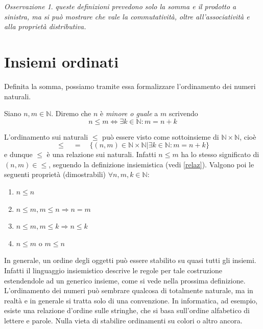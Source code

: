 \documentclass[oneside]{book}
\theoremstyle{remark}
\newtheorem*{osservaz}{Osservazione}
\begin{document}
\begin{osservaz}
\emph{queste definizioni prevedono solo la
somma e il prodotto a sinistra, ma si può mostrare che vale
la \textit{commutatività}, oltre all'associatività e alla
proprietà distributiva.}
\end{osservaz}



\section{Insiemi ordinati}
Definita la somma, possiamo tramite essa formalizzare
l'ordinamento dei numeri naturali.

\begin{tcolorbox}[colback=yellow!30, colframe=yellow!30!black, title={Ordinamento in $\mathbb{N}$}]
Siano $n,m\in\mathbb{N}$. Diremo che $n$ è \textit{minore o guale} a $m$
scrivendo
\[ n\leq m \Longleftrightarrow \exists k\in\mathbb{N}: m = n+k \]
\end{tcolorbox}
L'ordinamento sui naturali $\leq$ può essere visto come sottoinsieme
di $\mathbb{N}\times\mathbb{N}$, cioè \[ \leq \quad=\quad \{(n,m)\in\mathbb{N}\times\mathbb{N}|\exists k\in\mathbb{N}:m=n+k\} \]
e dunque $\leq$ è una relazione sui naturali. Infatti $n\leq m$ ha
lo stesso significato di $(n,m)\in\leq$, seguendo la definizione
insiemistica (vedi \ref{relaz}). Valgono poi le seguenti proprietà
(dimostrabili) $\forall n,m,k\in\mathbb{N}$:
\begin{enumerate}
\item $n\leq n$
\item $n\leq m, m\leq n \Longrightarrow n = m$
\item $n\leq m, m\leq k \Longrightarrow n \leq k$
\item $n\leq m \text{ o } m\leq n$
\end{enumerate}

In generale, un ordine degli oggetti può essere stabilito su
quasi tutti gli insiemi. Infatti il linguaggio insiemistico
descrive le regole per tale costruzione estendendole ad un
generico insieme, come si vede nella prossima definizione.
L'ordinamento dei numeri può sembrare qualcosa di totalmente
naturale, ma in realtà e in generale si tratta solo di una
convenzione. In informatica, ad esempio, esiste una relazione
d'ordine sulle stringhe, che si basa sull'ordine alfabetico
di lettere e parole. Nulla vieta di stabilire ordinamenti su
colori o altro ancora.
\end{document}

